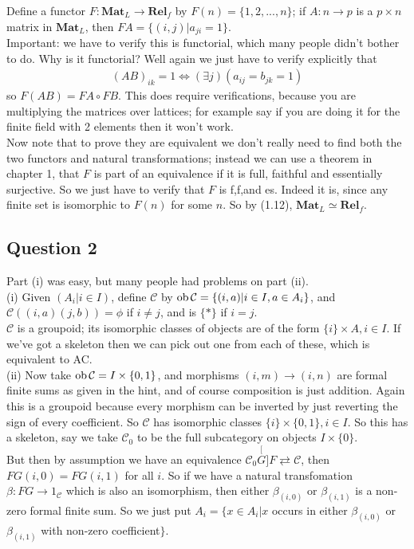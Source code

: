 \documentclass[a4paper]{article}
\begin{document}
Define a functor $F:\mathbf{Mat}_L \to \mathbf{Rel}_f$ by $F(n) = \{1,2,...,n\}$; if $A: n \to p$ is a $p \times n$ matrix in $\mathbf{Mat}_L$, then $FA = \{(i,j) | a_{ji} = 1\}$.\\
Important: we have to verify this is functorial, which many people didn't bother to do. Why is it functorial? Well again we just have to verify explicitly that
\begin{equation*}
    \begin{aligned}
        (AB)_{ik} = 1 \iff (\exists j) (a_{ij} = b_{jk} = 1)
    \end{aligned}
\end{equation*}
so $F(AB) = FA \circ FB$. This does require verifications, because you are multiplying the matrices over lattices; for example say if you are doing it for the finite field with 2 elements then it won't work.\\
Now note that to prove they are equivalent we don't really need to find both the two functors and natural transformations; instead we can use a theorem in chapter 1, that $F$ is part of an equivalence if it is full, faithful and essentially surjective. So we just have to verify that $F$ is f,f,and es. Indeed it is, since any finite set is isomorphic to $F(n)$ for some $n$. So by (1.12), $\mathbf{Mat}_L \simeq \mathbf{Rel}_f$.

\subsection{Question 2}
Part (i) was easy, but many people had problems on part (ii).\\
(i) Given $(A_i | i \in I)$, define $\mathcal{C}$ by $\operatorname{ob} \mathcal{C} =\{(i,a)| i \in I, a \in A_i\}$, and $\mathcal{C}((i,a)(j,b)) = \phi$ if $i \neq j$, and is $\{*\}$ if $i=j$.\\
$\mathcal{C}$ is a groupoid; its isomorphic classes of objects are of the form $\{i\} \times A,i \in I$. If we've got a skeleton then we can pick out one from each of these, which is equivalent to AC.\\
(ii) Now take $\operatorname{ob}\mathcal{C} =I\times \{0,1\}$, and morphisms $(i,m) \to (i,n)$ are formal finite sums as given in the hint, and of course composition is just addition. Again this is a groupoid because every morphism can be inverted by just reverting the sign of every coefficient. So $\mathcal{C}$ has isomorphic classes $\{i\} \times \{0,1\}, i \in I$. So this has a skeleton, say we take $\mathcal{C}_0$ to be the full subcategory on objects $I\times\{0\}$.\\
But then by assumption we have an equivalence $\mathcal{C}_0 \stackrel[G]{F}{\rightleftarrows} \mathcal{C}$, then $FG(i,0) = FG(i,1)$ for all $i$. So if we have a natural transfomation $\beta:FG \to 1_{\mathcal{C}}$ which is also an isomorphism, then either $\beta_{(i,0)}$ or $\beta_{(i,1)}$ is a non-zero formal finite sum. So we just put $A_i = \{x \in A_i | x$ occurs in either $\beta_{(i,0)}$ or $\beta_{(i,1)}$ with non-zero coefficient$\}$.
\end{document}
